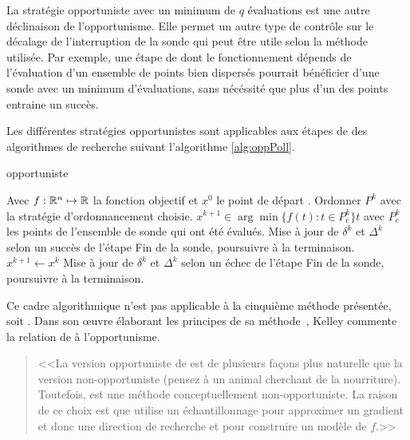 La stratégie opportuniste avec un minimum de $q$ évaluations est une autre déclinaison de l'opportunisme. Elle permet un autre type de contrôle sur le décalage de l'interruption de la sonde qui peut être utile selon la méthode utilisée. Par exemple, une étape de \SEARCH dont le fonctionnement dépends de l'évaluation d'un ensemble de points bien dispersés pourrait bénéficier d'une sonde avec un minimum d'évaluations, sans nécéssité que plus d'un des points entraine un succès. 

Les différentes stratégies opportunistes sont applicables aux étapes de \POLL des algorithmes de recherche suivant l'algorithme \ref{alg:oppPoll}.
\begin{algorithm}[H]
	\caption{\textsf{\POLL opportuniste}}
	\label{alg:oppPoll}
	\begin{algorithmic}
		\STATE Avec $f:\mathbb{R}^n \mapsto \mathbb{R}$ la fonction objectif et $x^0$ le point de départ
		. \POLL
		\bindent
		\STATE Ordonner $P^k$ avec la stratégie d'ordonnancement choisie.
		\STATE $x^{k+1} \in \arg \min \{f(t) : t \in P^k_e\}t$ avec $P^k_e$ les points de l'ensemble de sonde qui ont été évalués.
		\STATE Mise à jour de $\delta^k$ et $\Delta^k$ selon un succès de l'étape
		\STATE Fin de la sonde, poursuivre à la terminaison.
		\ENDIF
		\STATE $x^{k+1} \leftarrow x^{k}$
		\STATE Mise à jour de $\delta^k$ et $\Delta^k$ selon un échec de l'étape
		\ENDFOR
		\STATE Fin de la sonde, poursuivre à la terminaison.
		\eindent
	\end{algorithmic}
\end{algorithm}
Ce cadre algorithmique n'est pas applicable à la cinquième méthode présentée, soit \imfil. Dans son œuvre élaborant les principes de sa méthode~\cite{Kelley2011}, Kelley commente la relation de \imfil à l'opportunisme.
\begin{quote}
	<<La version opportuniste de \CS est de plusieurs façons plus naturelle que la version non-opportuniste (pensez à un animal cherchant de la nourriture). Toutefois, \imfil est une méthode conceptuellement non-opportuniste. La raison de ce choix est que \imfil utilise un échantillonnage pour approximer un gradient et donc une direction de recherche et pour construire un modèle de $f$.>>
\end{quote}

